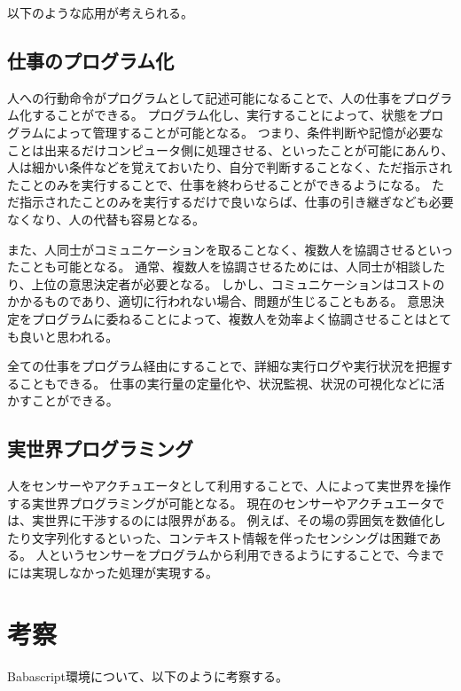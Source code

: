 以下のような応用が考えられる。

\subsection{仕事のプログラム化}\label{ux4ed5ux4e8bux306eux30d7ux30edux30b0ux30e9ux30e0ux5316}

人への行動命令がプログラムとして記述可能になることで、人の仕事をプログラム化することができる。
プログラム化し、実行することによって、状態をプログラムによって管理することが可能となる。
つまり、条件判断や記憶が必要なことは出来るだけコンピュータ側に処理させる、といったことが可能にあんり、人は細かい条件などを覚えておいたり、自分で判断することなく、ただ指示されたことのみを実行することで、仕事を終わらせることができるようになる。
ただ指示されたことのみを実行するだけで良いならば、仕事の引き継ぎなども必要なくなり、人の代替も容易となる。

また、人同士がコミュニケーションを取ることなく、複数人を協調させるといったことも可能となる。
通常、複数人を協調させるためには、人同士が相談したり、上位の意思決定者が必要となる。
しかし、コミュニケーションはコストのかかるものであり、適切に行われない場合、問題が生じることもある。
意思決定をプログラムに委ねることによって、複数人を効率よく協調させることはとても良いと思われる。

全ての仕事をプログラム経由にすることで、詳細な実行ログや実行状況を把握することもできる。
仕事の実行量の定量化や、状況監視、状況の可視化などに活かすことができる。

\subsection{実世界プログラミング}\label{ux5b9fux4e16ux754cux30d7ux30edux30b0ux30e9ux30dfux30f3ux30b0}

人をセンサーやアクチュエータとして利用することで、人によって実世界を操作する実世界プログラミングが可能となる。
現在のセンサーやアクチュエータでは、実世界に干渉するのには限界がある。
例えば、その場の雰囲気を数値化したり文字列化するといった、コンテキスト情報を伴ったセンシングは困難である。
人というセンサーをプログラムから利用できるようにすることで、今までには実現しなかった処理が実現する。

\section{考察}\label{ux8003ux5bdf}

Babascript環境について、以下のように考察する。

